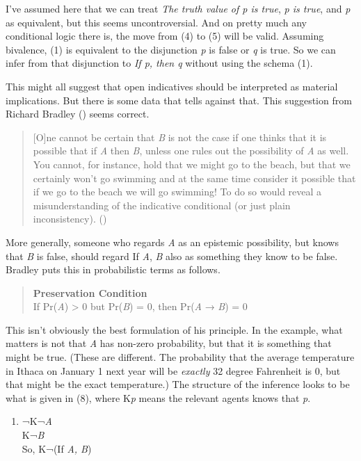 \documentclass[
  11pt,
  letterpaper,
  DIV=11,
  numbers=noendperiod,
  twoside]{scrartcl}
\providecommand{\tightlist}{%
  \setlength{\itemsep}{0pt}\setlength{\parskip}{0pt}}
\begin{document}
I've assumed here that we can treat \emph{The truth value of p is true},
\emph{p is true}, and \emph{p} as equivalent, but this seems
uncontroversial. And on pretty much any conditional logic there is, the
move from (4) to (5) will be valid. Assuming bivalence, (1) is
equivalent to the disjunction \emph{p} is false or \emph{q} is true. So
we can infer from that disjunction to \emph{If p, then q} without using
the schema (1).

This might all suggest that open indicatives should be interpreted as
material implications. But there is some data that tells against that.
This suggestion from Richard Bradley ()
seems correct.

\begin{quote}
{[}O{]}ne cannot be certain that \emph{B} is not the case if one thinks
that it is possible that if \emph{A} then \emph{B}, unless one rules out
the possibility of \emph{A} as well. You cannot, for instance, hold that
we might go to the beach, but that we certainly won't go swimming and at
the same time consider it possible that if we go to the beach we will go
swimming! To do so would reveal a misunderstanding of the indicative
conditional (or just plain inconsistency).
()
\end{quote}

More generally, someone who regards \emph{A} as an epistemic
possibility, but knows that \emph{B} is false, should regard If
\emph{A}, \emph{B} also as something they know to be false. Bradley puts
this in probabilistic terms as follows.

\begin{quote}
\textbf{Preservation Condition}\\
If Pr(\emph{A}) \textgreater{} 0 but Pr(\emph{B}) = 0, then Pr(\emph{A}
→ \emph{B}) = 0
\end{quote}

This isn't obviously the best formulation of his principle. In the
example, what matters is not that \emph{A} has non-zero probability, but
that it is something that might be true. (These are different. The
probability that the average temperature in Ithaca on January 1 next
year will be \emph{exactly} 32 degree Fahrenheit is 0, but that might be
the exact temperature.) The structure of the inference looks to be what
is given in (8), where K\emph{p} means the relevant agents knows that
\emph{p}.

\begin{enumerate}
\def\labelenumi{\arabic{enumi}.}
\setcounter{enumi}{7}
\tightlist
\item
  ¬K¬\emph{A}\\
  K¬\emph{B}\\
  So, K¬(If \emph{A, B})
\end{enumerate}
\end{document}
